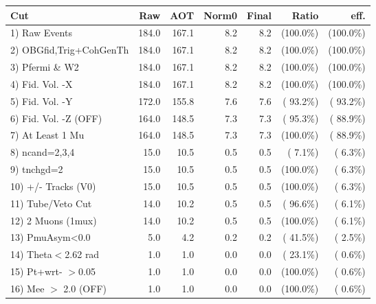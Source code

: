  \begin{table}[h!]\centering
 \begin{tabular}{||l||r|r|r|r|r|r||}
 \hline
 \hline
 Cut & Raw & AOT & Norm0 & Final & Ratio & eff.       \\
 \hline
  1) Raw Events           &        184.0 &        167.1 &          8.2 &          8.2 & (100.0\%) & (100.0\%) \\
  2) OBGfid,Trig+CohGenTh &        184.0 &        167.1 &          8.2 &          8.2 & (100.0\%) & (100.0\%) \\
  3) Pfermi \& W2         &        184.0 &        167.1 &          8.2 &          8.2 & (100.0\%) & (100.0\%) \\
  4) Fid. Vol. -X         &        184.0 &        167.1 &          8.2 &          8.2 & (100.0\%) & (100.0\%) \\
  5) Fid. Vol. -Y         &        172.0 &        155.8 &          7.6 &          7.6 & ( 93.2\%) & ( 93.2\%) \\
  6) Fid. Vol. -Z (OFF)   &        164.0 &        148.5 &          7.3 &          7.3 & ( 95.3\%) & ( 88.9\%) \\
  7) At Least 1 Mu        &        164.0 &        148.5 &          7.3 &          7.3 & (100.0\%) & ( 88.9\%) \\
  8) ncand=2,3,4          &         15.0 &         10.5 &          0.5 &          0.5 & (  7.1\%) & (  6.3\%) \\
  9) tnchgd=2             &         15.0 &         10.5 &          0.5 &          0.5 & (100.0\%) & (  6.3\%) \\
 10) +/- Tracks (V0)      &         15.0 &         10.5 &          0.5 &          0.5 & (100.0\%) & (  6.3\%) \\
 11) Tube/Veto Cut        &         14.0 &         10.2 &          0.5 &          0.5 & ( 96.6\%) & (  6.1\%) \\
 12) 2 Muons (1mux)       &         14.0 &         10.2 &          0.5 &          0.5 & (100.0\%) & (  6.1\%) \\
 13) PmuAsym<0.0          &          5.0 &          4.2 &          0.2 &          0.2 & ( 41.5\%) & (  2.5\%) \\
 14) Theta$<$2.62 rad     &          1.0 &          1.0 &          0.0 &          0.0 & ( 23.1\%) & (  0.6\%) \\
 15) Pt+wrt- $>$0.05      &          1.0 &          1.0 &          0.0 &          0.0 & (100.0\%) & (  0.6\%) \\
 16) Mee $>$ 2.0  (OFF)   &          1.0 &          1.0 &          0.0 &          0.0 & (100.0\%) & (  0.6\%) \\

\end{tabular}
\end{table}
